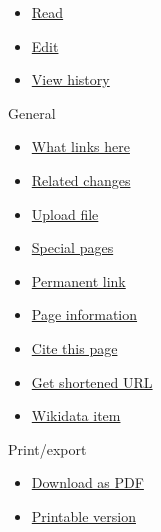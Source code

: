 \documentclass[
]{article}
\providecommand{\tightlist}{%
  \setlength{\itemsep}{0pt}\setlength{\parskip}{0pt}}
\begin{document}
\begin{itemize}
\tightlist
\item
  \label{ca-more-view}{\href{/wiki/Joule}{{Read}}}
\item
  \label{ca-more-edit}{\href{/w/index.php?title=Joule&action=edit}{{Edit}}}
\item
  \label{ca-more-history}{\href{/w/index.php?title=Joule&action=history}{{View
  history}}}
\end{itemize}

\label{p-tb}
General

\begin{itemize}
\tightlist
\item
  \label{t-whatlinkshere}{\href{/wiki/Special:WhatLinksHere/Joule}{{What
  links here}}}
\item
  \label{t-recentchangeslinked}{\href{/wiki/Special:RecentChangesLinked/Joule}{{Related
  changes}}}
\item
  \label{t-upload}{\href{/wiki/Wikipedia:File_Upload_Wizard}{{Upload
  file}}}
\item
  \label{t-specialpages}{\href{/wiki/Special:SpecialPages}{{Special
  pages}}}
\item
  \label{t-permalink}{\href{/w/index.php?title=Joule&oldid=1187127150}{{Permanent
  link}}}
\item
  \label{t-info}{\href{/w/index.php?title=Joule&action=info}{{Page
  information}}}
\item
  \label{t-cite}{\href{/w/index.php?title=Special:CiteThisPage&page=Joule&id=1187127150&wpFormIdentifier=titleform}{{Cite
  this page}}}
\item
  \label{t-urlshortener}{\href{/w/index.php?title=Special:UrlShortener&url=https\%3A\%2F\%2Fen.wikipedia.org\%2Fwiki\%2FJoule}{{Get
  shortened URL}}}
\item
  \label{t-wikibase}{\href{https://www.wikidata.org/wiki/Special:EntityPage/Q25269}{{Wikidata
  item}}}
\end{itemize}

\label{p-coll-print_export}
Print/export

\begin{itemize}
\tightlist
\item
  \label{coll-download-as-rl}{\href{/w/index.php?title=Special:DownloadAsPdf&page=Joule&action=show-download-screen}{{Download
  as PDF}}}
\item
  \label{t-print}{\href{/w/index.php?title=Joule&printable=yes}{{Printable
  version}}}
\end{itemize}
\end{document}
